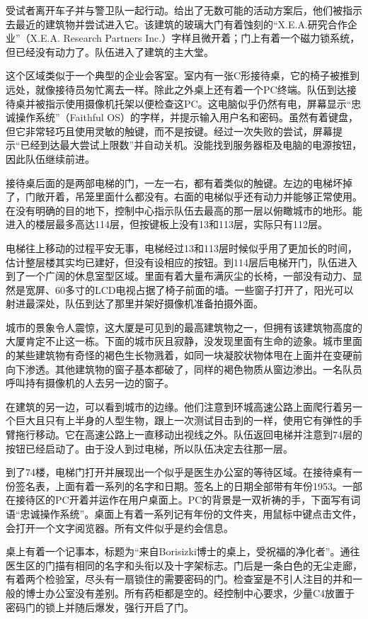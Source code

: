 \begin{scpbox}
受试者离开车子并与警卫队一起行动。给出了无数可能的活动方案后，他们被指示去最近的建筑物并尝试进入它。该建筑的玻璃大门有着蚀刻的“X.E.A.研究合作企业”（X.E.A. Research Partners Inc.）字样且微开着；门上有着一个磁力锁系统，但已经没有动力了。队伍进入了建筑的主大堂。

这个区域类似于一个典型的企业会客室。室内有一张C形接待桌，它的椅子被推到远处，就像接待员匆忙离去一样。除此之外桌上还有着一个PC终端。队伍到达接待桌并被指示使用摄像机托架以便检查这PC。这电脑似乎仍然有电，屏幕显示“忠诚操作系统”（Faithful OS）的字样，并提示输入用户名和密码。虽然有着键盘，但它非常轻巧且使用灵敏的触键，而不是按键。经过一次失败的尝试，屏幕提示“已经到达最大尝试上限数”并自动关机。没能找到服务器柜及电脑的电源按钮，因此队伍继续前进。

接待桌后面的是两部电梯的门，一左一右，都有着类似的触键。左边的电梯坏掉了，门敞开着，吊笼里面什么都没有。右面的电梯似乎还有动力并能够正常使用。在没有明确的目的地下，控制中心指示队伍去最高的那一层以俯瞰城市的地形。能进入的楼层最多高达114层，但按键板上没有13和113层，实际只有112层。

电梯往上移动的过程平安无事，电梯经过13和113层时候似乎用了更加长的时间，估计整层楼其实均已建好，但没有设相应的按钮。到114层后电梯开门，队伍进入到了一个广阔的休息室型区域。里面有着大量布满灰尘的长椅，一部没有动力、显然是宽屏、60多寸的LCD电视占据了椅子前面的墙。一些窗子打开了，阳光可以射进最深处，队伍到达了那里并架好摄像机准备拍摄外面。

城市的景象令人震惊，这大厦是可见到的最高建筑物之一，但拥有该建筑物高度的大厦肯定不止这一栋。下面的城市灰且寂静，没发现里面有生命的迹象。城市里面的某些建筑物有奇怪的褐色生长物溅着，如同一块凝胶状物体甩在上面并在变硬前向下渗透。其他建筑物的窗子基本都破了，同样的褐色物质从窗边渗出。一名队员呼叫持有摄像机的人去另一边的窗子。

在建筑的另一边，可以看到城市的边缘。他们注意到环城高速公路上面爬行着另一个巨大且只有上半身的人型生物，跟上一次测试目击到的一样，使用它有弹性的手臂拖行移动。它在高速公路上一直移动出视线之外。队伍返回电梯并注意到74层的按钮已经启动了。由于没人到过电梯，所以队伍决定去往那一层。

到了74楼，电梯门打开并展现出一个似乎是医生办公室的等待区域。在接待桌有一份签名表，上面有着一系列的名字和日期。签名上的日期全部带有年份1953。一部在接待区的PC开着并运作在用户桌面上。PC的背景是一双祈祷的手，下面写有词语“忠诚操作系统”。桌面上有着一系列记有年份的文件夹，用鼠标中键点击文件，会打开一个文字阅览器。所有文件似乎是约会信息。

桌上有着一个记事本，标题为“来自Borisizki博士的桌上，受祝福的净化者”。通往医生区的门描有相同的名字和头衔以及十字架标志。门后是一条白色的无尘走廊，有着两个检验室，尽头有一扇锁住的需要密码的门。检查室是不引人注目的并和一般的博士办公室没有差别。所有药柜都是空的。经控制中心要求，少量C4放置于密码门的锁上并随后爆发，强行开启了门。


\end{scpbox}
